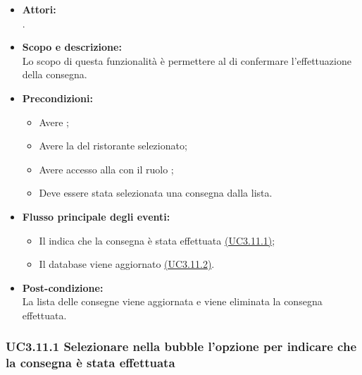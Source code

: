 \begin{itemize}
	\item \textbf{Attori:}
	\\.
	\item \textbf{Scopo e descrizione:} 
	\\Lo scopo di questa funzionalità è permettere al  di confermare l'effettuazione della consegna.
	\item \textbf{Precondizioni:}
	\begin{itemize}
		\item Avere ;
		\item Avere la  del ristorante selezionato;
		\item Avere accesso alla  con il ruolo ;
		\item Deve essere stata selezionata una consegna dalla lista.
	\end{itemize}
	\item \textbf{Flusso principale degli eventi:}
	\begin{itemize}
		\item Il  indica che la consegna è stata effettuata \hyperref[UC3.11.1]{(UC3.11.1)};
		\item Il database viene aggiornato \hyperref[UC3.11.2]{(UC3.11.2)}.
	\end{itemize}
	\item \textbf{Post-condizione:}
	\\La lista delle consegne viene aggiornata e viene eliminata la consegna effettuata.
\end{itemize}

\subsubsection{UC3.11.1 Selezionare nella bubble l'opzione per indicare che la consegna è stata effettuata} \label{UC3.11.1}

